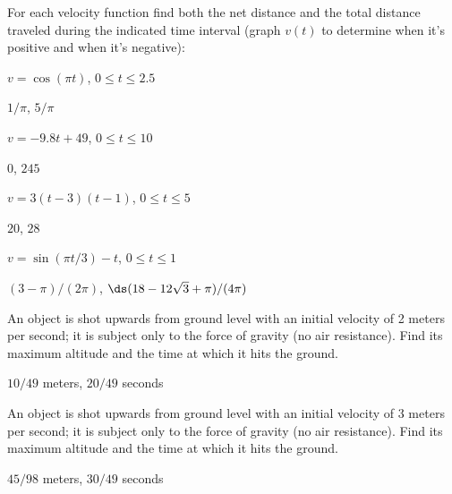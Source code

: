 \begin{exercises}

For each velocity function find both the net distance and the total
distance traveled during the indicated time interval (graph $v(t)$ to
determine when it's positive and when it's negative): 

\begin{exercise} $v=\cos(\pi t)$, $0\le t\le 2.5$
\begin{answer} $1/\pi$, $5/\pi$
\end{answer}\end{exercise}

\begin{exercise} $v=-9.8t+49$, $0\le t\le 10$
\begin{answer} $0$, $245$
\end{answer}\end{exercise}

\begin{exercise} $v=3(t-3)(t-1)$, $0\le t\le 5$
\begin{answer} $20$, $28$
\end{answer}\end{exercise}

\begin{exercise} $v=\sin(\pi t/3)-t$, $0\le t\le 1$
\begin{answer} $(3-\pi)/(2\pi)$, $\ds (18-12\sqrt3+\pi)/(4\pi)$
\end{answer}\end{exercise}

\begin{exercise} An object is shot upwards from ground level with an initial
velocity of 2 meters per second; it is subject only to the force of
gravity (no air resistance). Find its maximum altitude and the time at
which it hits the ground.
\begin{answer} $10/49$ meters, $20/49$ seconds
\end{answer}\end{exercise}

\begin{exercise} An object is shot upwards from ground level with an initial
velocity of 3 meters per second; it is subject only to the force of
gravity (no air resistance). Find its maximum altitude and the time at
which it hits the ground.
\begin{answer} $45/98$ meters, $30/49$ seconds
\end{answer}\end{exercise}


\end{exercises}
